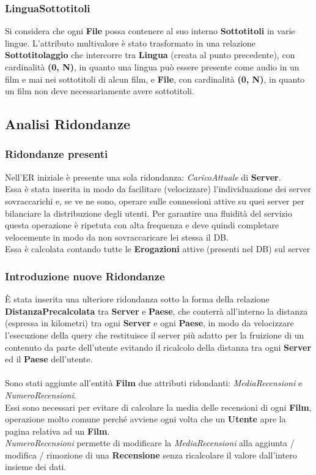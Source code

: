 \documentclass{article}
\begin{document}
\subsubsection{LinguaSottotitoli}
Si considera che ogni \textbf{File} possa contenere al suo interno \textbf{Sottotitoli} in varie lingue. L'attributo multivalore è stato trasformato in una relazione \textbf{Sottotitolaggio} che intercorre tra \textbf{Lingua} (creata al punto precedente), con cardinalità \textbf{(0, N)}, in quanto una lingua può essere presente come audio in un film e mai nei sottotitoli di alcun film, e \textbf{File}, con cardinalità \textbf{(0, N)}, in quanto un film non deve necessariamente avere sottotitoli.
\subsection{Analisi Ridondanze}
\subsubsection{Ridondanze presenti}
Nell'ER iniziale è presente una sola ridondanza: \textit{CaricoAttuale} di \textbf{Server}.
\\
Essa è stata inserita in modo da facilitare (velocizzare) l'individuazione dei server sovraccarichi e, se ve ne sono, operare sulle connessioni attive su quei server per bilanciare la distribuzione degli utenti. Per garantire una fluidità del servizio questa operazione è ripetuta con alta frequenza e deve quindi completare velocemente in modo da non sovraccaricare lei stessa il DB.
\\
Essa è calcolata contando tutte le \textbf{Erogazioni} attive (presenti nel DB) sul server
\subsubsection{Introduzione nuove Ridondanze}
È stata inserita una ulteriore ridondanza sotto la forma della relazione \textbf{DistanzaPrecalcolata} tra \textbf{Server} e \textbf{Paese}, che conterrà all'interno la distanza (espressa in kilometri) tra ogni \textbf{Server} e ogni \textbf{Paese}, in modo da velocizzare l'esecuzione della query che restituisce il server più adatto per la fruizione di un contenuto da parte dell'utente evitando il ricalcolo della distanza tra ogni \textbf{Server} ed il \textbf{Paese} dell'utente.
\\ \\
Sono stati aggiunte all'entità \textbf{Film} due attributi ridondanti: \textit{MediaRecensioni} e \textit{NumeroRecensioni}. \\
Essi sono necessari per evitare di calcolare la media delle recensioni di ogni \textbf{Film}, operazione molto comune perché avviene ogni volta che un \textbf{Utente} apre la pagina relativa ad un \textbf{Film}.\\
\textit{NumeroRecensioni} permette di modificare la \textit{MediaRecensioni} alla aggiunta / modifica / rimozione di una \textbf{Recensione} senza ricalcolare il valore dall'intero insieme dei dati.
%
%
%
%
%
%
%
%
\end{document}
